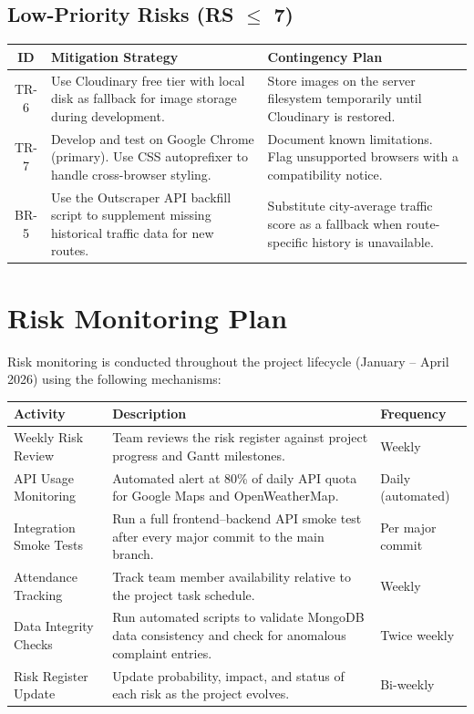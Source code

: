\documentclass[12pt,a4paper]{article}
\begin{document}
\subsection{Low-Priority Risks (RS $\leq$ 7)}

\begin{center}
\small
\begin{tabularx}{\textwidth}{c X X}
\toprule
\textbf{ID} & \textbf{Mitigation Strategy} & \textbf{Contingency Plan} \\
\midrule
TR-6 & Use Cloudinary free tier with local disk as fallback for image storage during development. & Store images on the server filesystem temporarily until Cloudinary is restored. \\[6pt]
TR-7 & Develop and test on Google Chrome (primary). Use CSS autoprefixer to handle cross-browser styling. & Document known limitations. Flag unsupported browsers with a compatibility notice. \\[6pt]
BR-5 & Use the Outscraper API backfill script to supplement missing historical traffic data for new routes. & Substitute city-average traffic score as a fallback when route-specific history is unavailable. \\[6pt]
\bottomrule
\end{tabularx}
\end{center}

\section{Risk Monitoring Plan}

Risk monitoring is conducted throughout the project lifecycle (January -- April 2026) using the following mechanisms:

\begin{center}
\begin{tabularx}{\textwidth}{l X l}
\toprule
\textbf{Activity} & \textbf{Description} & \textbf{Frequency} \\
\midrule
Weekly Risk Review & Team reviews the risk register against project progress and Gantt milestones. & Weekly \\[4pt]
API Usage Monitoring & Automated alert at 80\% of daily API quota for Google Maps and OpenWeatherMap. & Daily (automated) \\[4pt]
Integration Smoke Tests & Run a full frontend--backend API smoke test after every major commit to the main branch. & Per major commit \\[4pt]
Attendance Tracking & Track team member availability relative to the project task schedule. & Weekly \\[4pt]
Data Integrity Checks & Run automated scripts to validate MongoDB data consistency and check for anomalous complaint entries. & Twice weekly \\[4pt]
Risk Register Update & Update probability, impact, and status of each risk as the project evolves. & Bi-weekly \\[4pt]
\bottomrule
\end{tabularx}
\end{center}
\end{document}
